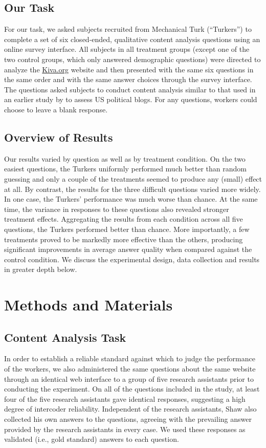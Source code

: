 \documentclass{cscw2010}
\begin{document}
\subsection{Our Task} 
For our task, we asked subjects recruited from Mechanical Turk (``Turkers'') to complete a set of six closed-ended,
qualitative content analysis questions using an online survey
interface. All subjects in all treatment groups (except one of the two
control groups, which only answered demographic questions) were
directed to analyze the \href{http://www.kiva.org}{Kiva.org} website and then presented with the same
six questions in the same order and with the same answer choices
through the survey interface. The questions asked subjects to conduct
content analysis similar to that used in an earlier study by
\cite{benklershaw2010} to assess US political blogs. For any
questions, workers could choose to leave a blank response.


\subsection{Overview of Results} 
Our results varied by question as well as by
treatment condition. On the two easiest questions, the Turkers
uniformly performed much better than random guessing and only a couple
of the treatments seemed to produce any (small) effect at all. By
contrast, the results for the three difficult questions varied more
widely. In one case, the Turkers' performance was much worse than
chance. At the same time, the variance in responses to these questions
also revealed stronger treatment effects. Aggregating the results from
each condition across all five questions, the Turkers performed better
than chance. More importantly, a few treatments proved to be markedly more effective
than the others, producing significant improvements in
average answer quality when compared against the control condition. We
discuss the experimental design, data collection and results in
greater depth below.

\section{Methods and Materials}

\subsection{Content Analysis Task}

In order to establish a reliable standard against which to judge the
performance of the workers, we also administered the same questions
about the same website through an identical web interface to a group
of five research assistants prior to conducting the experiment. On all
of the questions included in the study, at least four of the five
research assistants gave identical responses, suggesting a high degree
of intercoder reliability. Independent of the research assistants,
Shaw also collected his own answers to the questions, agreeing
with the prevailing answer provided by the research assistants in
every case. We used these responses as validated (i.e., gold standard)
answers to each question.
\end{document}

